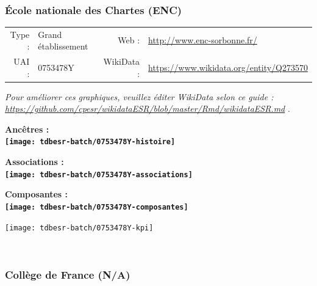 \documentclass[12pt,french,]{article}
\begin{document}
\ifoddpage \fi ~\newpage  

\hypertarget{uxe9cole-nationale-des-chartes-enc}{%
\subsubsection{École nationale des Chartes
(ENC)}\label{uxe9cole-nationale-des-chartes-enc}}

\begin{tabular*}{\textwidth}{rp{5cm}rl}  
\hline  
Type : & Grand établissement & Web : &\href{http://www.enc-sorbonne.fr/}{http://www.enc-sorbonne.fr/} \\  
UAI : & 0753478Y & WikiData : & \href{https://www.wikidata.org/entity/Q273570}{https://www.wikidata.org/entity/Q273570} \\  
\hline  
\end{tabular*}

\textit{\scriptsize Pour améliorer ces graphiques, veuillez éditer WikiData selon ce guide :  \href{https://github.com/cpesr/wikidataESR/blob/master/Rmd/wikidataESR.md}{https://github.com/cpesr/wikidataESR/blob/master/Rmd/wikidataESR.md}}
.

\vspace{1cm}  
\begin{minipage}[b]{0.50\textwidth}\begin{center} \bf Ancêtres : \\  
\texttt{[image: tdbesr-batch/0753478Y-histoire]} \end{center}\end{minipage}\begin{minipage}[b]{0.50\textwidth}\begin{center} \bf Associations : \\  
\texttt{[image: tdbesr-batch/0753478Y-associations]} \end{center}\end{minipage}

\hrulefill

\begin{center} \bf Composantes : \\  
\texttt{[image: tdbesr-batch/0753478Y-composantes]} \end{center}

\begin{center}\texttt{[image: tdbesr-batch/0753478Y-kpi]} \end{center}\checkoddpage

\ifoddpage \fi ~\newpage  

\hypertarget{colluxe8ge-de-france-na}{%
\subsubsection{Collège de France (N/A)}\label{colluxe8ge-de-france-na}}
\end{document}
